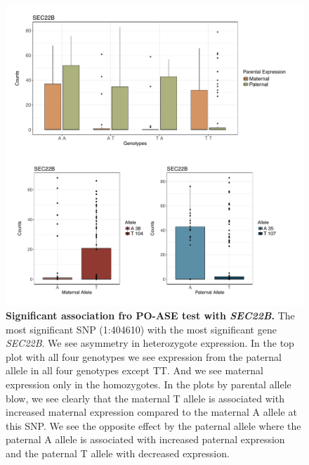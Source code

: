 \begin{figure}[!htb]
\centering \includegraphics[width=5in]{img/ch04/fig-12-SEC22B.pdf}
\caption[Significant association from PO-ASE test with \emph{SEC22B}.]{\textbf{Significant association fro PO-ASE test with \emph{SEC22B}.} The most significant SNP (1:404610) with the most significant gene \emph{SEC22B}. We see asymmetry in heterozygote expression. In the top plot with all four genotypes we see expression from the paternal allele in all four genotypes except TT. And we see maternal expression only in the homozygotes. In the plots by parental allele blow, we see clearly that the maternal T allele is associated with increased maternal expression compared to the maternal A allele at this SNP.  We see the opposite effect by the paternal allele where the paternal A allele is associated with increased paternal expression and the paternal T allele with decreased expression. }
\label{fig:SEC22B}
\end{figure}



